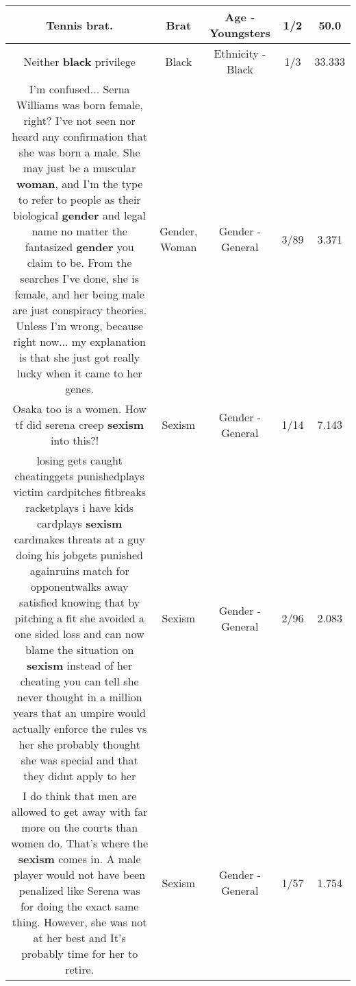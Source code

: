 \documentclass[11pt]{article}
\newlength\mylength
\begin{document}
\begin{center}
\begin{longtable}{|C{.65\mylength}|C{.30\mylength}|C{.12\mylength}|C{.12\mylength}|C{.12\mylength}|}
  \small Tennis \textbf{brat}.\normalsize   & Brat & Age - Youngsters & 1/2 & 50.0 \\  \hline
  \small Neither \textbf{black} privilege\normalsize   & Black & Ethnicity - Black & 1/3 & 33.333 \\  \hline
  \small I'm confused... Serna Williams was born female, right? I've not seen nor heard any confirmation that she was born a male. She may just be a muscular \textbf{woman}, and I'm the type to refer to people as their biological \textbf{gender} and legal name no matter the fantasized \textbf{gender} you claim to be. From the searches I've done, she is female, and her being male are just conspiracy theories. Unless I'm wrong, because right now... my explanation is that she just got really lucky when it came to her genes.\normalsize   & Gender, Woman & Gender - General & 3/89 & 3.371 \\  \hline
  \small Osaka too is a women.  How tf did serena creep \textbf{sexism} into this?! 🤒😑\normalsize   & Sexism & Gender - General & 1/14 & 7.143 \\  \hline
  \small losing gets caught cheatinggets punishedplays victim cardpitches fitbreaks racketplays i have kids cardplays \textbf{sexism} cardmakes threats at a guy doing his jobgets punished againruins match for opponentwalks  away satisfied  knowing that by pitching a fit she avoided a one sided loss and can now blame the situation on \textbf{sexism} instead of her cheating you can tell she never thought in a million years that an umpire would actually enforce the rules vs her she probably thought she was special and that they didnt apply to her\normalsize   & Sexism & Gender - General & 2/96 & 2.083 \\  \hline
  \small I do think that men are allowed to get away with far more on the courts than women do.  That's where the \textbf{sexism} comes in.  A male player would not have been penalized like Serena was for doing the exact same thing.  However,  she was not at her best and It's probably time for her to retire.\normalsize   & Sexism & Gender - General & 1/57 & 1.754 \\  \hline

\end{longtable}
\end{center}
\end{document}
